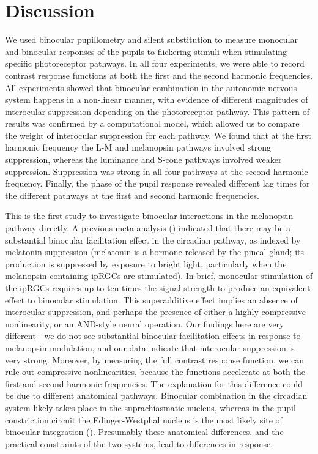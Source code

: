 \documentclass[
]{article}
\begin{document}
\section{Discussion}\label{discussion}

We used binocular pupillometry and silent substitution to measure monocular and binocular responses of the pupils to flickering stimuli when stimulating specific photoreceptor pathways. In all four experiments, we were able to record contrast response functions at both the first and the second harmonic frequencies. All experiments showed that binocular combination in the autonomic nervous system happens in a non-linear manner, with evidence of different magnitudes of interocular suppression depending on the photoreceptor pathway. This pattern of results was confirmed by a computational model, which allowed us to compare the weight of interocular suppression for each pathway. We found that at the first harmonic frequency the L-M and melanopsin pathways involved strong suppression, whereas the luminance and S-cone pathways involved weaker suppression. Suppression was strong in all four pathways at the second harmonic frequency. Finally, the phase of the pupil response revealed different lag times for the different pathways at the first and second harmonic frequencies.

This is the first study to investigate binocular interactions in the melanopsin pathway directly. A previous meta-analysis () indicated that there may be a substantial binocular facilitation effect in the circadian pathway, as indexed by melatonin suppression (melatonin is a hormone released by the pineal gland; its production is suppressed by exposure to bright light, particularly when the melanopsin-containing ipRGCs are stimulated). In brief, monocular stimulation of the ipRGCs requires up to ten times the signal strength to produce an equivalent effect to binocular stimulation. This superadditive effect implies an absence of interocular suppression, and perhaps the presence of either a highly compressive nonlinearity, or an AND-style neural operation. Our findings here are very different - we do not see substantial binocular facilitation effects in response to melanopsin modulation, and our data indicate that interocular suppression is very strong. Moreover, by measuring the full contrast response function, we can rule out compressive nonlinearities, because the functions accelerate at both the first and second harmonic frequencies. The explanation for this difference could be due to different anatomical pathways. Binocular combination in the circadian system likely takes place in the suprachiasmatic nucleus, whereas in the pupil constriction circuit the Edinger-Westphal nucleus is the most likely site of binocular integration (). Presumably these anatomical differences, and the practical constraints of the two systems, lead to differences in response.
\end{document}
